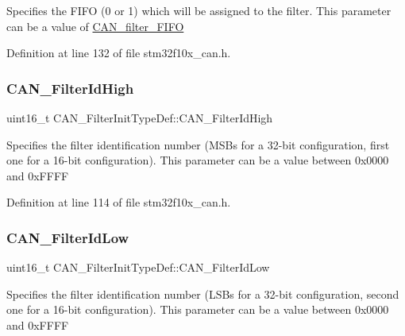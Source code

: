 Specifies the F\+I\+FO (0 or 1) which will be assigned to the filter. This parameter can be a value of \hyperlink{group___c_a_n__filter___f_i_f_o}{C\+A\+N\+\_\+filter\+\_\+\+F\+I\+FO} 

Definition at line 132 of file stm32f10x\+\_\+can.\+h.

\mbox{\label{struct_c_a_n___filter_init_type_def_afc109aa8eedced09d296605f2eb871f7}} 
\subsubsection{\texorpdfstring{C\+A\+N\+\_\+\+Filter\+Id\+High}{CAN\_FilterIdHigh}}
{\footnotesize\ttfamily uint16\+\_\+t C\+A\+N\+\_\+\+Filter\+Init\+Type\+Def\+::\+C\+A\+N\+\_\+\+Filter\+Id\+High}

Specifies the filter identification number (M\+S\+Bs for a 32-\/bit configuration, first one for a 16-\/bit configuration). This parameter can be a value between 0x0000 and 0x\+F\+F\+FF 

Definition at line 114 of file stm32f10x\+\_\+can.\+h.

\mbox{\label{struct_c_a_n___filter_init_type_def_ab8c56b48ac323e8c7a1b535c79a51f87}} 
\subsubsection{\texorpdfstring{C\+A\+N\+\_\+\+Filter\+Id\+Low}{CAN\_FilterIdLow}}
{\footnotesize\ttfamily uint16\+\_\+t C\+A\+N\+\_\+\+Filter\+Init\+Type\+Def\+::\+C\+A\+N\+\_\+\+Filter\+Id\+Low}

Specifies the filter identification number (L\+S\+Bs for a 32-\/bit configuration, second one for a 16-\/bit configuration). This parameter can be a value between 0x0000 and 0x\+F\+F\+FF 

